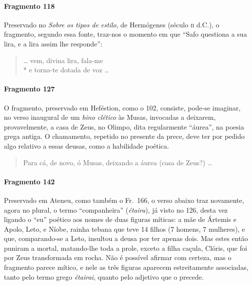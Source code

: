 \paragraph{Fragmento 118}

{\small Preservado no \textit{Sobre os tipos de estilo}, de Hermógenes (século \textsc{ii} d.C.),
o fragmento, segundo essa fonte, traz-nos o momento em que ``Safo
questiona a sua lira, e a lira assim lhe responde”:}

\begin{verse}
\ldots{} vem, divina lira, fala-me\\*
e torna-te dotada de voz \ldots{}
\end{verse}

\paragraph{Fragmento 127}

{\small O fragmento, preservado em Heféstion, como o 102, consiste, pode-se imaginar, no
verso inaugural de um \textit{hino clético }às Musas, invocadas a deixarem,
provavelmente, a casa de Zeus, no Olimpo, dita regularmente ``áurea”,
na poesia grega antiga. O chamamento, repetido no presente da prece, deve ter
por pedido algo relativo a essas deusas, como a habilidade poética.}

\begin{verse}
Para cá, de novo, ó Musas, deixando a áurea \qb{}(casa de Zeus?) \ldots{}
\end{verse}

\paragraph{Fragmento 142}

{\small Preservado em Ateneu, como também o Fr.~166, o verso abaixo traz novamente,
agora no plural, o termo ``companheira” (\textit{étaira}), já visto no
126, desta vez ligando o “eu” poético aos nomes de duas figuras míticas: a mãe de
Ártemis e Apolo, Leto, e Níobe, rainha tebana que teve 14 filhos (7 homens, 7
mulheres), e que, comparando-se a Leto, insultou a deusa por ter apenas dois.
Mas estes então puniram a mortal, matando-lhe toda a prole, exceto a filha
caçula, Clóris, que foi por Zeus transformada em rocha. Não é possível afirmar
com certeza, mas o fragmento parece mítico, e nele as três figuras aparecem
estreitamente associadas, tanto pelo termo grego \textit{étairai}, quanto pelo
adjetivo que o precede.}


